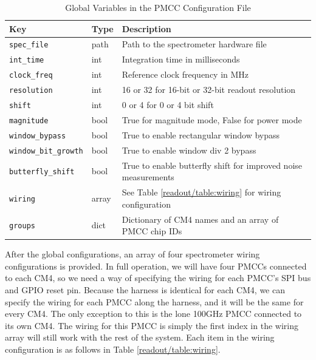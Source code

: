 \begin{table}[ht!]
    \centering
    \begin{tabularx}{\textwidth}{l|l|X}
        \textbf{Key} & \textbf{Type} & \textbf{Description} \\ \hline    
        \texttt{spec\_file} & path & Path to the spectrometer hardware file \\
        \texttt{int\_time} & int & Integration time in milliseconds \\
        \texttt{clock\_freq} & int & Reference clock frequency in MHz \\
        \texttt{resolution} & int & 16 or 32 for 16-bit or 32-bit readout resolution \\
        \texttt{shift} & int & 0 or 4 for 0 or 4 bit shift \\
        \texttt{magnitude} & bool & True for magnitude mode, False for power mode \\
        \texttt{window\_bypass} & bool & True to enable rectangular window bypass \\
        \texttt{window\_bit\_growth} & bool & True to enable window div 2 bypass \\
        \texttt{butterfly\_shift} & bool & True to enable butterfly shift for improved noise measurements \\
        \texttt{wiring} & array & See Table \ref{readout/table:wiring} for wiring configuration \\
        \texttt{groups} & dict & Dictionary of CM4 names and an array of PMCC chip IDs  \\
    \end{tabularx}
    \label{readout/table:pmcc_config}
    \caption{Global Variables in the PMCC Configuration File}
\end{table}

After the global configurations, an array of four spectrometer wiring configurations is provided. 
In full operation, we will have four PMCCs connected to each CM4, so we need a way of specifying the wiring for each PMCC's SPI bus and GPIO reset pin.
Because the harness is identical for each CM4, we can specify the wiring for each PMCC along the harness, and it will be the same for every CM4. 
The only exception to this is the lone 100GHz PMCC connected to its own CM4. 
The wiring for this PMCC is simply the first index in the wiring array will still work with the rest of the system.
Each item in the wiring configuration is as follows in Table \ref{readout/table:wiring}.

